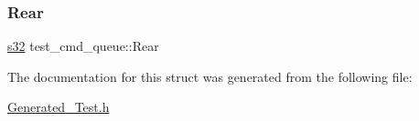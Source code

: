 \mbox{\label{structtest__cmd__queue_a7cedef36f33507cbadf3f4ef95aa7cec}} 
\subsubsection{\texorpdfstring{Rear}{Rear}}
{\footnotesize\ttfamily \hyperlink{ab__common_8h_ae9b1af5c037e57a98884758875d3a7c4}{s32} test\+\_\+cmd\+\_\+queue\+::\+Rear}



The documentation for this struct was generated from the following file\+:\begin{DoxyCompactItemize}
\item 
\hyperlink{Generated__Test_8h}{Generated\+\_\+\+Test.\+h}\end{DoxyCompactItemize}
